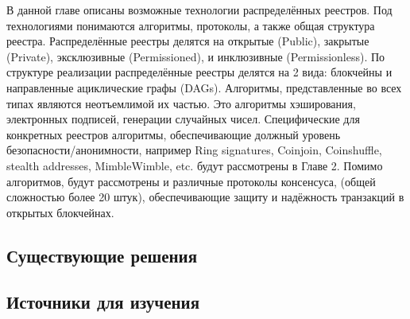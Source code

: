 В данной главе описаны возможные технологии распределённых реестров. Под
технологиями понимаются алгоритмы, протоколы, а также общая структура реестра.
Распределённые реестры делятся на открытые (Public), закрытые (Private),
эксклюзивные (Permissioned), и инклюзивные (Permissionless).
По структуре реализации распределённые реестры делятся на 2 вида: блокчейны и
направленные ациклические графы (DAGs). Алгоритмы, представленные во всех типах
являются неотъемлимой их частью. Это алгоритмы хэширования, электронных
подписей, генерации случайных чисел. Специфические для конкретных реестров
алгоритмы, обеспечивающие должный уровень безопасности/анонимности, например
Ring signatures, Coinjoin, Coinshuffle, stealth addresses, MimbleWimble, etc.
будут рассмотрены в Главе 2. Помимо алгоритмов, будут рассмотрены и различные
протоколы консенсуса, (общей сложностью более 20 штук), обеспечивающие защиту и
надёжность транзакций в открытых блокчейнах.

\subsection{Существующие решения}


\newpage

\subsection{Источники для изучения}


